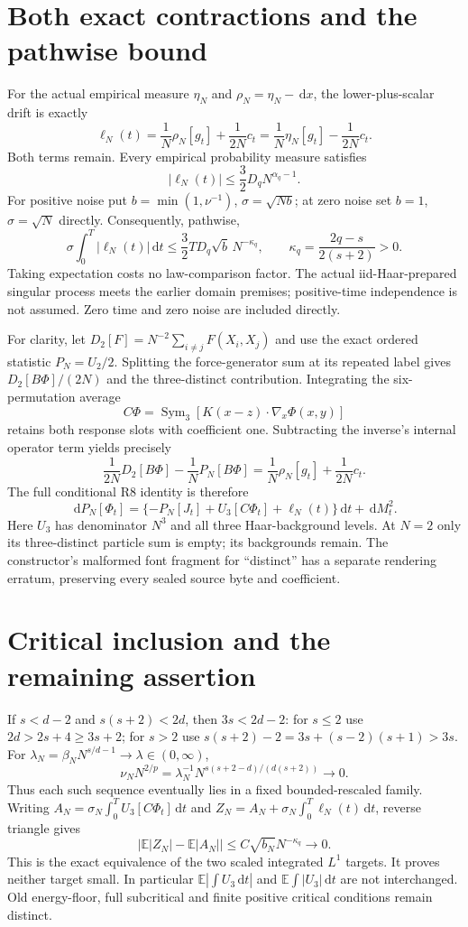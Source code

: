 \documentclass[10pt]{article}
\newcommand{\E}{\mathbb E}
\newcommand{\dd}{\,\mathrm d}
\begin{document}
\newpage
\section*{Both exact contractions and the pathwise bound}
For the actual empirical measure $\eta_N$ and $\rho_N=\eta_N-\dd x$, the
lower-plus-scalar drift is exactly
\[
 \ell_N(t)=\frac1N\rho_N[g_t]+\frac1{2N}c_t
          =\frac1N\eta_N[g_t]-\frac1{2N}c_t.
\]
Both terms remain. Every empirical probability measure satisfies
\[
 |\ell_N(t)|\le\frac32D_qN^{\alpha_q-1}.
\]
For positive noise put $b=\min(1,\nu^{-1})$, $\sigma=\sqrt{Nb}$; at zero
noise set $b=1$, $\sigma=\sqrt N$ directly. Consequently, pathwise,
\[
 \sigma\int_0^T|\ell_N(t)|\dd t
 \le\frac32TD_q\sqrt b\,N^{-\kappa_q},\qquad
 \kappa_q=\frac{2q-s}{2(s+2)}>0.
\]
Taking expectation costs no law-comparison factor. The actual iid-Haar-prepared
singular process meets the earlier domain premises; positive-time independence
is not assumed. Zero time and zero noise are included directly.

For clarity, let $D_2[F]=N^{-2}\sum_{i\ne j}F(X_i,X_j)$ and use the exact
ordered statistic $P_N=U_2/2$. Splitting the force-generator sum at its repeated
label gives $D_2[B\Phi]/(2N)$ and the three-distinct contribution.
Integrating the six-permutation average
\[
 C\Phi=\operatorname{Sym}_3[K(x-z)\cdot\nabla_x\Phi(x,y)]
\]
retains both response slots with coefficient one. Subtracting the inverse's
internal operator term yields precisely
\[
 \frac1{2N}D_2[B\Phi]-\frac1NP_N[B\Phi]
 =\frac1N\rho_N[g_t]+\frac1{2N}c_t.
\]
The full conditional R8 identity is therefore
\[
 \dd P_N[\Phi_t]=\{-P_N[J_t]+U_3[C\Phi_t]+\ell_N(t)\}\dd t+\dd M_t^2.
\]
Here $U_3$ has denominator $N^3$ and all three Haar-background levels.
At $N=2$ only its three-distinct particle sum is empty; its backgrounds remain.
The constructor's malformed font fragment for ``distinct'' has a separate
rendering erratum, preserving every sealed source byte and coefficient.

\section*{Critical inclusion and the remaining assertion}
If $s<d-2$ and $s(s+2)<2d$, then $3s<2d-2$: for $s\le2$ use
$2d>2s+4\ge3s+2$; for $s>2$ use
$s(s+2)-2=3s+(s-2)(s+1)>3s$.
For $\lambda_N=\beta_NN^{s/d-1}\to\lambda\in(0,\infty)$,
\[
 \nu_NN^{2/p}=\lambda_N^{-1}N^{s(s+2-d)/(d(s+2))}\longrightarrow0.
\]
Thus each such sequence eventually lies in a fixed bounded-rescaled family.
Writing $A_N=\sigma_N\int_0^T U_3[C\Phi_t]\dd t$ and
$Z_N=A_N+\sigma_N\int_0^T\ell_N(t)\dd t$, reverse triangle gives
\[
 \big|\E|Z_N|-\E|A_N|\big|\le C\sqrt{b_N}N^{-\kappa_q}\longrightarrow0.
\]
This is the exact equivalence of the two scaled integrated $L^1$ targets.
It proves neither target small. In particular $\E|\int U_3\dd t|$ and
$\E\int|U_3|\dd t$ are not interchanged. Old energy-floor, full subcritical
and finite positive critical conditions remain distinct.
\end{document}
